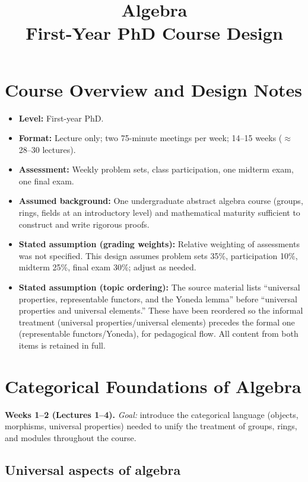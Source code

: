 \documentclass{article}
\title{Algebra\\[4pt]\large First-Year PhD Course Design}
\author{}
\date{}
\begin{document}
\maketitle

\section*{Course Overview and Design Notes}
\begin{itemize}
  \item \textbf{Level:} First-year PhD.
  \item \textbf{Format:} Lecture only; two 75-minute meetings per week; 14--15 weeks ($\approx$28--30 lectures).
  \item \textbf{Assessment:} Weekly problem sets, class participation, one midterm exam, one final exam.
  \item \textbf{Assumed background:} One undergraduate abstract algebra course (groups, rings, fields at an introductory level) and mathematical maturity sufficient to construct and write rigorous proofs.
  \item \textbf{Stated assumption (grading weights):} Relative weighting of assessments was not specified. This design assumes problem sets 35\%, participation 10\%, midterm 25\%, final exam 30\%; adjust as needed.
  \item \textbf{Stated assumption (topic ordering):} The source material lists ``universal properties, representable functors, and the Yoneda lemma'' before ``universal properties and universal elements.'' These have been reordered so the informal treatment (universal properties/universal elements) precedes the formal one (representable functors/Yoneda), for pedagogical flow. All content from both items is retained in full.
\end{itemize}

\section{Categorical Foundations of Algebra}
\textbf{Weeks 1--2 (Lectures 1--4).} \emph{Goal:} introduce the categorical language (objects, morphisms, universal properties) needed to unify the treatment of groups, rings, and modules throughout the course.

\subsection{Universal aspects of algebra}
\end{document}
